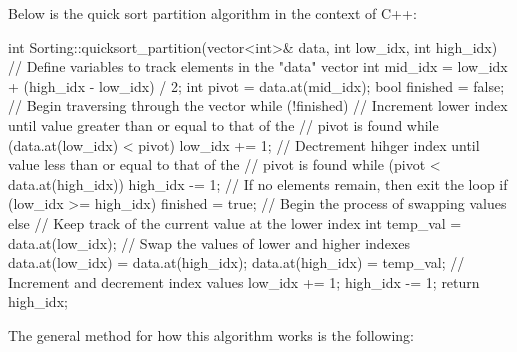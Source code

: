 \begin{highlight}

Below is the quick sort partition algorithm in the context of C++:

\begin{code}
int Sorting::quicksort_partition(vector<int>& data, int low_idx, int high_idx){
    // Define variables to track elements in the "data" vector
    int mid_idx = low_idx + (high_idx - low_idx) / 2;
    int pivot = data.at(mid_idx);
    bool finished = false;
    // Begin traversing through the vector
    while (!finished) {
    // Increment lower index until value greater than or equal to that of the 
    // pivot is found
    while (data.at(low_idx) < pivot) {
        low_idx += 1;
    }
    // Dectrement hihger index until value less than or equal to that of the 
    // pivot is found
    while (pivot < data.at(high_idx)) {
        high_idx -= 1;
    }
    // If no elements remain, then exit the loop
    if (low_idx >= high_idx) {
        finished = true;
    }
    // Begin the process of swapping values
    else {
        // Keep track of the current value at the lower index
        int temp_val = data.at(low_idx);
        // Swap the values of lower and higher indexes
        data.at(low_idx) = data.at(high_idx);
        data.at(high_idx) = temp_val;
        // Increment and decrement index values
        low_idx += 1;
        high_idx -= 1;
        }
    }
    return high_idx;
}
\end{code}

The general method for how this algorithm works is the following:


\end{highlight}
